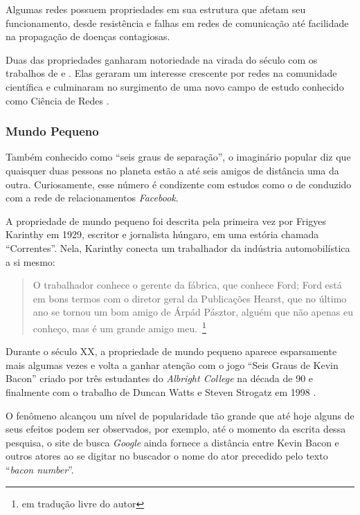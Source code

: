 \documentclass[12pt,a4paper]{article}
\theoremstyle{hypo}
\begin{document}
Algumas redes possuem propriedades em sua estrutura que afetam seu funcionamento, desde resistência e falhas em redes de comunicação até facilidade na propagação de doenças contagiosas.

Duas das propriedades ganharam notoriedade na virada do século com os trabalhos de  e . Elas geraram um interesse crescente por redes na comunidade científica e culminaram no surgimento de uma novo campo de estudo conhecido como Ciência de Redes \cite{Barabasi2016-rn}.

\subsubsection{Mundo Pequeno} \label{sec:small-world}

Também conhecido como \enquote{seis graus de separação}, o imaginário popular diz que quaisquer duas pessoas no planeta estão a até seis amigos de distância uma da outra. Curiosamente, esse número é condizente com estudos como o de  conduzido com a rede de relacionamentos \textit{Facebook}.

A propriedade de mundo pequeno foi descrita pela primeira vez por Frigyes Karinthy em 1929, escritor e jornalista húngaro, em uma estória chamada \enquote{Correntes}. Nela, Karinthy conecta um trabalhador da indústria automobilística a si mesmo:

\blockcquote{Karinthy1929-jg}{O trabalhador conhece o gerente da fábrica, que conhece Ford; Ford está em bons termos com o diretor geral da Publicações Hearst, que no último ano se tornou um bom amigo de Árpád Pásztor, alguém que não apenas eu conheço, mas é um grande amigo meu.~\footnote{em tradução livre do autor}}

Durante o século XX, a propriedade de mundo pequeno aparece esparsamente mais algumas vezes e volta a ganhar atenção com o jogo \enquote{Seis Graus de Kevin Bacon} criado por três estudantes do \textit{Albright College} na década de 90 e finalmente com o trabalho de Duncan Watts e Steven Strogatz em 1998 \cite{Barabasi2016-rn}.

O fenômeno alcançou um nível de popularidade tão grande que até hoje alguns de seus efeitos podem ser observados, por exemplo, até o momento da escrita dessa pesquisa, o site de busca \textit{Google} ainda fornece a distância entre Kevin Bacon e outros atores ao se digitar no buscador o nome do ator precedido pelo texto \enquote{\textit{bacon number}}.
\end{document}
